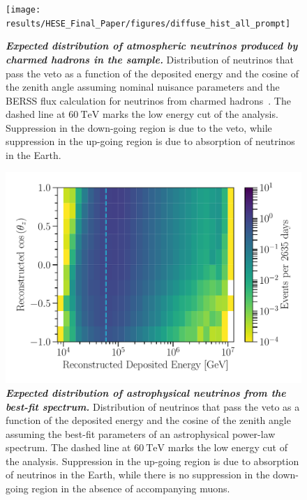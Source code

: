 \begin{figure}
	\centering
	\texttt{[image: results/HESE\_Final\_Paper/figures/diffuse\_hist\_all\_prompt]}
	\caption{\textbf{\textit{Expected distribution of atmospheric neutrinos produced by charmed hadrons in the sample.}} Distribution of neutrinos that pass the veto as a function of the deposited energy and the cosine of the zenith angle assuming nominal nuisance parameters and the BERSS flux calculation for neutrinos from  charmed hadrons~\cite{Bhattacharya:2015jpa}.
		The dashed line at $\SI{60}\TeV$ marks the low energy cut of the analysis.
		Suppression in the down-going region is due to the veto, while suppression in the up-going region is due to absorption of neutrinos in the Earth.}\label{fig:prompt_distribution}
\end{figure}

\begin{figure}
	\centering
	\includegraphics[width=0.8\linewidth]{figures/diffuse_hist_all_astro_fit}
	\caption{\textbf{\textit{Expected distribution of astrophysical neutrinos from the best-fit spectrum.}} Distribution of neutrinos that pass the veto as a function of the deposited energy and the cosine of the zenith angle assuming the best-fit parameters of an astrophysical power-law spectrum.
		The dashed line at $\SI{60}\TeV$ marks the low energy cut of the analysis.
		Suppression in the up-going region is due to absorption of neutrinos in the Earth, while there is no suppression in the down-going region in the absence of accompanying muons.}\label{fig:astro_distribution}
\end{figure}

